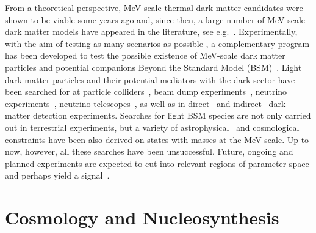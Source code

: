 From a theoretical perspective, MeV-scale thermal dark matter candidates were shown to be viable some years ago \cite{Boehm:2003hm,Boehm:2003bt,Feng:2008ya} and, since then, a large number of MeV-scale dark matter models have appeared in the literature, see e.g.~\cite{Boehm:2006mi,Farzan:2009ji,Farzan:2011ck,Batell:2017cmf,Ballett:2019cqp,Lamprea:2019qet,Blennow:2019fhy,Krnjaic:2015mbs,Bondarenko:2019vrb,Hochberg:2014dra,Agrawal:2014ufa,Kamada:2018zxi,Knapen:2017xzo,Hall:2009bx,Chu:2011be,Hambye:2019dwd,Dvorkin:2019zdi,Evans:2019vxr}. Experimentally, with the aim of testing as many scenarios as possible \cite{Bertone:2018xtm}, a complementary program has been developed to test the possible existence of MeV-scale dark matter particles and potential companions Beyond the Standard Model (BSM)~\cite{Essig:2013lka,Alexander:2016aln,Battaglieri:2017aum,Beacham:2019nyx}. Light dark matter particles and their potential mediators with the dark sector have been searched for at particle colliders~\cite{Borodatchenkova:2005ct,Batell:2009yf,Fox:2011fx,Essig:2013vha,Lees:2014xha,Babusci:2015zda,Lees:2017lec,Aaij:2017rft}, beam dump experiments~\cite{Bjorken:2009mm,Batell:2009di,Andreas:2012mt}, neutrino experiments~\cite{PalomaresRuiz:2007eu,Harnik:2012ni,deNiverville:2012ij,Batell:2014yra,Klop:2018ltd,Kelly:2019wow}, neutrino telescopes~\cite{Kamada:2015era,Arguelles:2017atb,Alvey:2019jzx}, as well as in direct~\cite{Essig:2015cda,Lee:2015qva,Derenzo:2016fse,Essig:2017kqs,Agnese:2018col,Agnes:2018oej,Abramoff:2019dfb,Aprile:2019xxb} and indirect~\cite{Slatyer:2015jla,Essig:2013goa,Bartels:2017dpb} dark matter detection experiments. Searches for light BSM species are not only carried out in terrestrial experiments, but a variety of astrophysical~\cite{Raffelt:1996wa,Dreiner:2013mua,Chang:2018rso,DeRocco:2019jti,Farzan:2002wx,Heurtier:2016otg} and cosmological~\cite{Xu:2018efh,Campo:2017nwh,Berlin:2018sjs,Wilkinson:2014ksa,Bertoni:2014mva,Vogel:2013raa,Escudero:2019gzq,Dolgov:2013una} constraints have been also derived on states with masses at the MeV scale. Up to now, however, all these searches have been unsuccessful. Future, ongoing and planned experiments are expected to cut into relevant regions of parameter space and perhaps yield a signal~\cite{Essig:2013lka,Alexander:2016aln,Battaglieri:2017aum,Beacham:2019nyx,Kou:2018nap,Ariga:2019ufm,Alekhin:2015byh,Chou:2016lxi,Akesson:2018vlm}.

\section{Cosmology and Nucleosynthesis}

